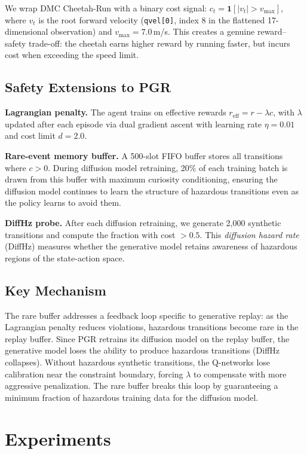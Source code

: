 \documentclass[11pt]{article}
\begin{document}
We wrap DMC Cheetah-Run \citep{tassa2018dmcontrol} with a binary cost signal:
$c_t = \mathbf{1}[|v_t| > v_{\max}]$,
where $v_t$ is the root forward velocity (\texttt{qvel[0]}, index 8 in the flattened 17-dimensional observation) and $v_{\max} = 7.0$\,m/s.
This creates a genuine reward--safety trade-off: the cheetah earns higher reward by running faster, but incurs cost when exceeding the speed limit.

\subsection{Safety Extensions to PGR}

\textbf{Lagrangian penalty.}
The agent trains on effective rewards $r_{\text{eff}} = r - \lambda c$, with $\lambda$ updated after each episode via dual gradient ascent with learning rate $\eta = 0.01$ and cost limit $d = 2.0$.

\textbf{Rare-event memory buffer.}
A 500-slot FIFO buffer stores all transitions where $c > 0$.
During diffusion model retraining, 20\% of each training batch is drawn from this buffer with maximum curiosity conditioning, ensuring the diffusion model continues to learn the structure of hazardous transitions even as the policy learns to avoid them.

\textbf{DiffHz probe.}
After each diffusion retraining, we generate 2{,}000 synthetic transitions and compute the fraction with cost $> 0.5$.
This \emph{diffusion hazard rate} (DiffHz) measures whether the generative model retains awareness of hazardous regions of the state-action space.

\subsection{Key Mechanism}

The rare buffer addresses a feedback loop specific to generative replay:
as the Lagrangian penalty reduces violations, hazardous transitions become rare in the replay buffer.
Since PGR retrains its diffusion model on the replay buffer, the generative model loses the ability to produce hazardous transitions (DiffHz collapses).
Without hazardous synthetic transitions, the Q-networks lose calibration near the constraint boundary, forcing $\lambda$ to compensate with more aggressive penalization.
The rare buffer breaks this loop by guaranteeing a minimum fraction of hazardous training data for the diffusion model.

\section{Experiments}
\label{sec:experiments}
\end{document}
